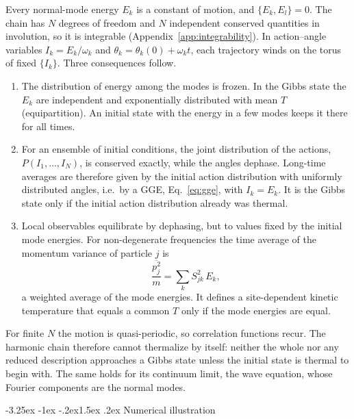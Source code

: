 \documentclass[10pt,a4paper]{article}
\makeatletter
\renewcommand{\subsection}{\@startsection{subsection}{2}{\z@}%
  {-3.25ex \@plus -1ex \@minus -.2ex}{1.5ex \@plus .2ex}%
  {\normalfont\fontsize{15.5pt}{19pt}\selectfont\bfseries}}
\makeatother
\begin{document}
Every normal-mode energy $ E_k $ is a constant of motion, and $ \{ E_k , E_l \} = 0 $.
The chain has $ N $ degrees of freedom and $ N $ independent conserved quantities in involution, so it is integrable (Appendix~\ref{app:integrability}).
In action--angle variables $ I_k = E_k/\omega_k $ and $ \theta_k = \theta_k(0) + \omega_k t $, each trajectory winds on the torus of fixed $ \{I_k\} $.
Three consequences follow.

\begin{enumerate}[label=(\alph*), leftmargin=2.2em]
\item The distribution of energy among the modes is frozen. In the Gibbs state the $ E_k $ are independent and exponentially distributed with mean $ T $ (equipartition). An initial state with the energy in a few modes keeps it there for all times.
\item For an ensemble of initial conditions, the joint distribution of the actions, $ P(I_1,\dots,I_N) $, is conserved exactly, while the angles dephase. Long-time averages are therefore given by the initial action distribution with uniformly distributed angles, i.e.\ by a GGE, Eq.~\eqref{eq:gge}, with $ I_k = E_k $. It is the Gibbs state only if the initial action distribution already was thermal.
\item Local observables equilibrate by dephasing, but to values fixed by the initial mode energies. For non-degenerate frequencies the time average of the momentum variance of particle $ j $ is
\begin{equation}
  \frac{\overline{p_j^2}}{m} = \sum_k S_{jk}^2 \, E_k ,
  \label{eq:chain-local}
\end{equation}
a weighted average of the mode energies. It defines a site-dependent kinetic temperature that equals a common $ T $ only if the mode energies are equal.
\end{enumerate}
For finite $ N $ the motion is quasi-periodic, so correlation functions recur.
The harmonic chain therefore cannot thermalize by itself: neither the whole nor any reduced description approaches a Gibbs state unless the initial state is thermal to begin with.
The same holds for its continuum limit, the wave equation, whose Fourier components are the normal modes.

\subsection{Numerical illustration}
\label{sec:chain-numerics}
\end{document}
